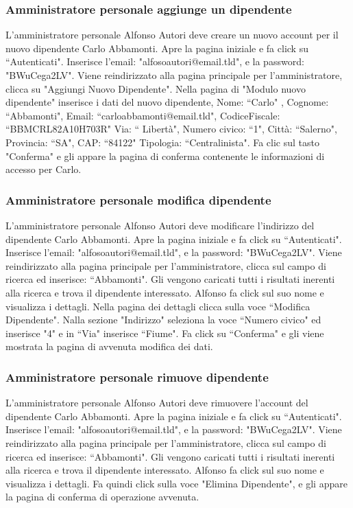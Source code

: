 \documentclass[12pt]{article}
\begin{document}
\subsubsection{Amministratore personale aggiunge un dipendente}
L'amministratore personale Alfonso Autori deve creare un nuovo account per il nuovo dipendente Carlo Abbamonti.
Apre la pagina iniziale e fa click su ``Autenticati".
Inserisce l'email: "alfosoautori@email.tld", e la password: "BWuCega2LV".
Viene reindirizzato alla pagina principale per l'amministratore, clicca su "Aggiungi Nuovo Dipendente".
Nella pagina di "Modulo nuovo dipendente" inserisce i dati del nuovo dipendente,
Nome: ``Carlo" , Cognome: ``Abbamonti", 
Email: ``carloabbamonti@email.tld",
CodiceFiscale: ``BBMCRL82A10H703R"
Via: `` Libertà", Numero civico: ``1", Città: ``Salerno", Provincia: ``SA", CAP: ``84122"
Tipologia: ``Centralinista".
Fa clic sul tasto "Conferma" e gli appare la pagina di conferma contenente le informazioni di accesso per Carlo.

\subsubsection{Amministratore personale modifica dipendente}
L'amministratore personale Alfonso Autori deve modificare l'indirizzo del dipendente Carlo Abbamonti.
Apre la pagina iniziale e fa click su ``Autenticati".
Inserisce l'email: "alfosoautori@email.tld", e la password: "BWuCega2LV".
Viene reindirizzato alla pagina principale per l'amministratore, 
clicca sul campo di ricerca ed inserisce: ``Abbamonti".
Gli vengono caricati tutti i risultati inerenti alla ricerca e trova il dipendente interessato. Alfonso fa click sul suo nome e visualizza i dettagli.
Nella pagina dei dettagli clicca sulla voce ``Modifica Dipendente".
Nalla sezione "Indirizzo" seleziona la voce ``Numero civico" ed inserisce "4" e in ``Via" inserisce ``Fiume".
Fa click su ``Conferma" e gli viene mostrata la pagina di avvenuta modifica dei dati.

\subsubsection{Amministratore personale rimuove dipendente}
L'amministratore personale Alfonso Autori deve rimuovere l'account del dipendente Carlo Abbamonti.
Apre la pagina iniziale e fa click su ``Autenticati".
Inserisce l'email: "alfosoautori@email.tld", e la password: "BWuCega2LV".
Viene reindirizzato alla pagina principale per l'amministratore, 
clicca sul campo di ricerca ed inserisce: ``Abbamonti".
Gli vengono caricati tutti i risultati inerenti alla ricerca e trova il dipendente interessato. Alfonso fa click sul suo nome e visualizza i dettagli.
Fa quindi click sulla voce "Elimina Dipendente", e gli appare la pagina di conferma di operazione avvenuta.
\end{document}
